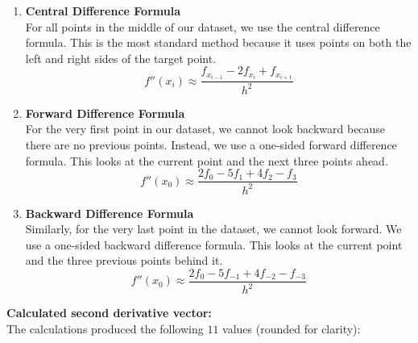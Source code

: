 \begin{enumerate}
    \item \textbf{Central Difference Formula} \cite[page 329]{MathewsFink2003} \\
    For all points in the middle of our dataset, we use the central difference formula. This is the most standard method because it uses points on both the left and right sides of the target point.
    \begin{equation*}
        f''(x_i) \approx \frac{f_{x_{i-1}} - 2f_{x_{i}} + f_{x_{i+1}}}{h^2}
    \end{equation*}

    \item \textbf{Forward Difference Formula} \cite[page 333]{MathewsFink2003} \\
    For the very first point in our dataset, we cannot look backward because there are no previous points. Instead, we use a one-sided forward difference formula. This looks at the current point and the next three points ahead.
    \begin{equation*}
        f''(x_0) \approx \frac{2f_0 - 5f_1 + 4f_2 - f_3}{h^2}
    \end{equation*}

    \item \textbf{Backward Difference Formula} \cite[page 333]{MathewsFink2003} \\
    Similarly, for the very last point in the dataset, we cannot look forward. We use a one-sided backward difference formula. This looks at the current point and the three previous points behind it.
    \begin{equation*}
        f''(x_0) \approx \frac{2f_0 - 5f_{-1} + 4f_{-2} - f_{-3}}{h^2}
    \end{equation*}
\end{enumerate}

\vspace{5pt}
\noindent\textbf{Calculated second derivative vector:} \\
The calculations produced the following $11$ values (rounded for clarity):

\begin{center}
\end{center}

